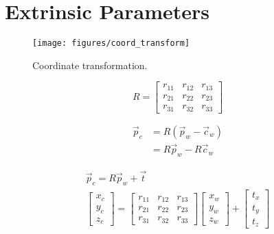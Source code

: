 \section{Extrinsic Parameters}
\begin{figure}[h!]
    \centering
    \texttt{[image: figures/coord\_transform]}
    \caption{Coordinate transformation.}
\end{figure}

\begin{equation}
    R =
    \begin{bmatrix}
        r_{11} & r_{12} & r_{13} \\
        r_{21} & r_{22} & r_{23} \\
        r_{31} & r_{32} & r_{33}
    \end{bmatrix}
\end{equation}


\begin{subequations} \label{eqn:main}
    \begin{alignat}{2}
        \vec{p}_c & = R(\vec{p}_w-\vec{c}_w) \label{subeqn:a} \\
                  & = R\vec{p}_w -R\vec{c}_w \label{subeqn:b}
    \end{alignat}
\end{subequations}


\begin{gather}
    \vec{p}_c = R\vec{p}_w + \vec{t} \\
    \begin{bmatrix}
        x_c \\ y_c \\ z_c
    \end{bmatrix}
    =
    \begin{bmatrix}
        r_{11} & r_{12} & r_{13} \\
        r_{21} & r_{22} & r_{23} \\
        r_{31} & r_{32} & r_{33}
    \end{bmatrix}
    \begin{bmatrix}
        x_w \\ y_w \\ z_w
    \end{bmatrix}
    +
    \begin{bmatrix}
        t_x \\ t_y \\ t_z
    \end{bmatrix}
\end{gather}


